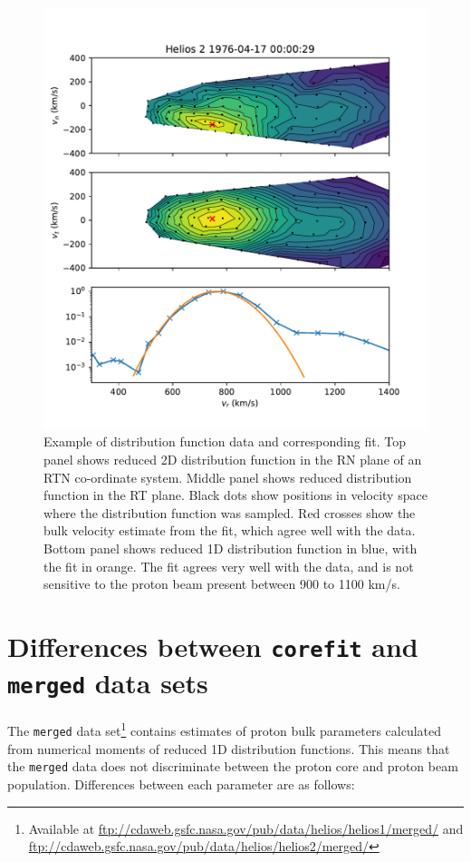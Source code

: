 \documentclass[11pt,a4paper]{article}
\begin{document}
\begin{figure}
	\centering
	\includegraphics[width=\textwidth]{I3_3D_example}
	\caption{Example of distribution function data and corresponding fit. Top panel shows reduced 2D distribution function in the RN plane of an RTN co-ordinate system. Middle panel shows reduced distribution function in the RT plane. Black dots show positions in velocity space where the distribution function was sampled. Red crosses show the bulk velocity estimate from the fit, which agree well with the data. Bottom panel shows reduced 1D distribution function in blue, with the fit in orange. The fit agrees very well with the data, and is not sensitive to the proton beam present between 900 to 1100 km/s.}
	\label{fig:distribution fit}
\end{figure}

\section{Differences between \texttt{corefit} and \texttt{merged} data sets}
The \texttt{merged} data set\footnote{Available at \url{ftp://cdaweb.gsfc.nasa.gov/pub/data/helios/helios1/merged/} and \url{ftp://cdaweb.gsfc.nasa.gov/pub/data/helios/helios2/merged/}} contains estimates of proton bulk parameters calculated from numerical moments of reduced 1D distribution functions. This means that the \texttt{merged} data does not discriminate between the proton core and proton beam population. Differences between each parameter are as follows:
\end{document}
